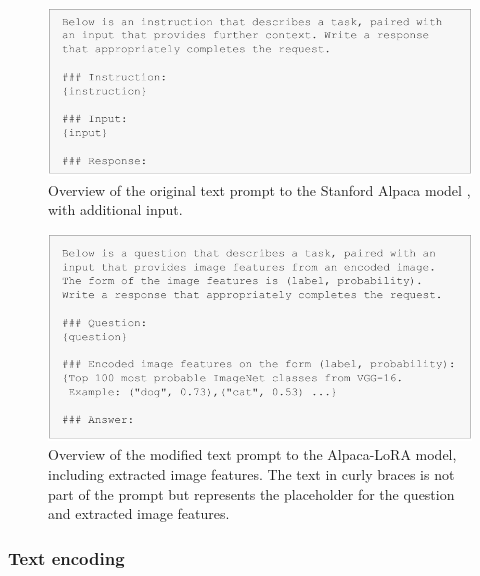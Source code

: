         \begin{figure}[htb]
            \centerline{
            \includegraphics[width=\textwidth]{images/alpaca_prompt_format}}
            \caption[Overview of the original text prompt to the Stanford Alpaca model, with additional input.]{Overview of the original text prompt to the Stanford Alpaca model \cite{taoriStanfordCRFM, taoriStanfordAlpacaInstructionfollowing2023}, with additional input.}
            \label{fig:alpaca_prompt_format}
        \end{figure}

        \begin{figure}[htb]
            \centerline{
            \includegraphics[width=\textwidth]{images/alpaca_modified_prompt_format}}
            \caption[Overview of the modified text prompt to the Alpaca-LoRA model.]{Overview of the modified text prompt to the Alpaca-LoRA model, including extracted image features. The text in curly braces is not part of the prompt but represents the placeholder for the question and extracted image features.}
            \label{fig:alpaca_modified_prompt_format}
        \end{figure}



        

        \subsubsection{Text encoding}
        \label{sec3:text_encoding}

